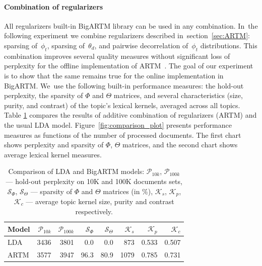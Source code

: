 \documentclass{acm_proc_article-sp}
\begin{document}
\paragraph{Combination of regularizers}

All regularizers built-in \mbox{BigARTM} library can be used in any combination.
In~the following experiment we combine regularizers described in~section~\ref{sec:ARTM}:
sparsing of~$\phi_{t}$, sparsing of~$\theta_{d}$, and pairwise decorrelation of~$\phi_{t}$ distributions.
This combination improves several quality measures without significant loss of perplexity
for the offline implementation of ARTM~\cite{voron14aist}.
The goal of our experiment is to show that the same remains true
for the online implementation in BigARTM.
We~use the following built-in performance measures:
the hold-out perplexity,
the sparsity of $\Phi$ and $\Theta$ matrices, and
several characteristics (size, purity, and contrast) of the topic's lexical kernels, averaged across all topics.
%
Table \ref{tab:model_comparison} compares the results of additive combination of regularizers (ARTM) and the usual LDA model.
Figure~\ref{fig:comparison_plot} presents performance measures as functions of the number of processed documents.
The first chart shows perplexity and sparsity of $\Phi$, $\Theta$ matrices, and
the second chart shows average lexical kernel measures.

\begin{table}[t]
    \caption{Comparison of LDA and BigARTM models:
        $\mathcal{P}_{10k}$, $\mathcal{P}_{100k}$ --- hold-out perplexity on 10K and 100K documents sets,
        $\mathcal{S}_{\Phi}$, $\mathcal{S}_{\Theta}$ --- sparsity of $\Phi$ and $\Theta$ matrices (in \%),
        $\mathcal{K}_{s}$, $\mathcal{K}_{p}$, $\mathcal{K}_{c}$ --- average topic kernel size, purity and contrast respectively.}
    \label{tab:model_comparison}
    \centering\tabcolsep=4.6pt
    \begin{tabular}[t]{l|rrrrrrr}
    \hline
    Model & $\mathcal{P}_{10k}$ & $\mathcal{P}_{100k}$ &  $\mathcal{S}_{\Phi}$ & $\mathcal{S}_{\Theta}$ &  $\mathcal{K}_{s}$ & $\mathcal{K}_{p}$ &  $\mathcal{K}_{c}$ \\
    \hline
        LDA    & 3436 & 3801 & 0.0  & 0.0  & 873  & 0.533 & 0.507 \\
        ARTM   & 3577 & 3947 & 96.3 & 80.9 & 1079 & 0.785 & 0.731 \\
    \hline

    \end{tabular}
\end{table}
\end{document}

